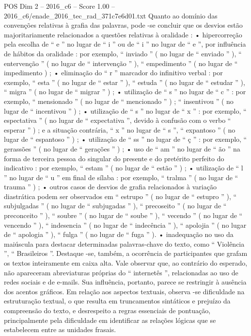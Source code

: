 \begin{textsample}{POS Dim 2 – 2016\_c6 – Score 1.00 – 2016\_c6/enade\_2016\_tec\_rad\_371c7e6d01.txt}
Quanto ao domínio das convenções relativas à grafia das palavras, pode -se concluir que os desvios estão majoritariamente relacionados a questões relativas à oralidade : • hipercorreção pela escolha de “ e ” no lugar de “ i ” ou de “ i ” no lugar de “ e ”, por influência de hábitos da oralidade : por exemplo, “ inviado ” ( no lugar de “ enviado ” ), “ entervenção ” ( no lugar de “ intervenção ” ), “ empedimento ” ( no lugar de “ impedimento ) ; • eliminação do “ r ” marcador do infinitivo verbal : por exemplo, “ esta ” ( no lugar de “ estar ” ), “ estuda ” ( no lugar de “ estudar ” ), “ migra ” ( no lugar de “ migrar ” ) ; • utilização de “ s ” no lugar de “ c ” : por exemplo, “ mensionado ” ( no lugar de “ mencionado ” ) ; “ insentivou ” ( no lugar de “ incentivou ” ) ; • utilização de “ s ” no lugar de “ x ” : por exemplo, “ espectativa ” ( no lugar de “ expectativa ”, devido à confusão com o verbo “ esperar ” ) ; e a situação contrária, “ x ” no lugar de “ s ”, “ expantoso ” ( no lugar de “ espantoso ” ) ; • utilização de “ ss ” no lugar de “ ç ” : por exemplo, “ gerassões ” ( no lugar de “ gerações ” ) ; • uso de “ am ” no lugar de “ ão ” na forma de terceira pessoa do singular do presente e do pretérito perfeito do indicativo : por exemplo, “ estam ” ( no lugar de “ estão ” ) ; • utilização de “ l ” no lugar de “ u ” em final de sílaba : por exemplo, “ tralma ” ( no lugar de “ trauma ” ) ; • outros casos de desvios de grafia relacionados à variação diastrática podem ser observados em “ estrupo ” ( no lugar de “ estupro ” ), “ subjulgadas ” ( no lugar de “ subjugadas ” ), “ precoseito ” ( no lugar de “ preconceito ” ), “ soubre ” ( no lugar de “ soube ” ), “ vecendo ” ( no lugar de “ vencendo ” ), “ indesencia ” ( no lugar de “ indecência ” ), “ apolojia ” ( no lugar de “ apologia ” ), “ fulga ” ( no lugar de “ fuga ” ). • inadequação no uso da maiúscula para destacar determinadas palavras-chave do texto, como “ Violência ”, “ Brasileiros ”.
Destaque -se, também, a ocorrência de participantes que grafam os textos inteiramente em caixa alta.
Vale observar que, ao contrário do esperado, não apareceram abreviaturas próprias do “ internetês ”, relacionadas ao uso de redes sociais e de e-mails.
Sua influência, portanto, parece se restringir à ausência dos acentos gráficos.
Em relação aos aspectos textuais, observa -se dificuldade na estruturação textual, o que resulta em truncamentos sintáticos e prejuízo da compreensão do texto, e desrespeito a regras essenciais de pontuação, principalmente pela dificuldade em identificar as relações lógicas que se estabelecem entre as unidades frasais.

\end{textsample}
